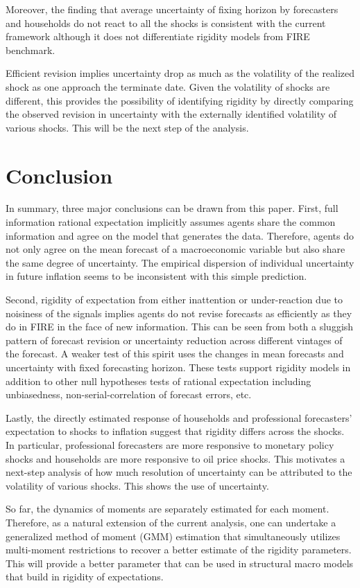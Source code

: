 \documentclass[]{article}
\begin{document}
	Moreover, the finding that average uncertainty of fixing horizon by forecasters and households do not react to all the shocks is consistent with the current framework although it does not differentiate rigidity models from FIRE benchmark.  
	
	Efficient revision implies  uncertainty drop as much as the volatility of the realized shock as one approach the terminate date. Given the volatility of shocks are different, this provides the possibility of identifying rigidity by directly comparing the observed revision in uncertainty with the externally identified volatility of various shocks. This will be the next step of the analysis.  
	
	\section{Conclusion}\label{Conclusion}
	
	In summary, three major conclusions can be drawn from this paper.  First, full information rational expectation implicitly assumes agents share the common information and agree on the model that generates the data. Therefore, agents do not only agree on the mean forecast of a macroeconomic variable but also share the same degree of uncertainty. The empirical dispersion of individual uncertainty in future inflation seems to be inconsistent with this simple prediction. 
	
	Second, rigidity of expectation from either inattention or under-reaction due to noisiness of the signals implies agents do not revise forecasts as efficiently as they do in FIRE in the face of new information. This can be seen from both a sluggish pattern of forecast revision or uncertainty reduction across different vintages of the forecast. A weaker test of this spirit uses the changes in mean forecasts and uncertainty with fixed forecasting horizon. These tests support rigidity models in addition to other null hypotheses tests of rational expectation including unbiasedness,  non-serial-correlation of forecast errors, etc.
	
	Lastly, the directly estimated response of households and professional forecasters' expectation to shocks to inflation suggest that rigidity differs across the shocks. In particular, professional forecasters are more responsive to monetary policy shocks and households are more responsive to oil price shocks. This motivates a next-step analysis of how much resolution of uncertainty can be attributed to the volatility of various shocks. This shows the use of uncertainty.
	
	So far, the dynamics of moments are separately estimated for each moment. Therefore, as a natural extension of the current analysis, one can undertake a generalized method of moment (GMM) estimation that simultaneously utilizes multi-moment restrictions to recover a better estimate of the rigidity parameters.  This will provide a better parameter that can be used in structural macro models that build in rigidity of expectations. 
	
	
	
	
\end{document}
